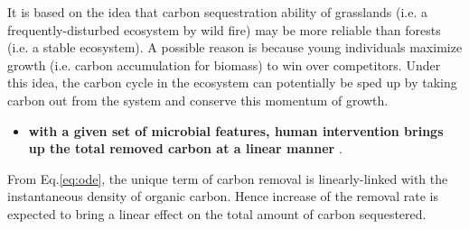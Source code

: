 \documentclass[../thesis.tex]{subfiles} %
\begin{document}
It is based on the idea that carbon sequestration ability of grasslands (i.e. a frequently-disturbed ecosystem by wild fire) may be more reliable than forests (i.e. a stable ecosystem).\autocite{dass2018grasslands}  A possible reason is because young individuals maximize growth (i.e. carbon accumulation for biomass) to win over competitors.  Under this idea, the carbon cycle in the ecosystem can potentially be sped up by taking carbon out from the system and conserve this momentum of growth.

\begin{itemize}
    \item \textbf{with a given set of microbial features, human intervention brings up the total removed carbon at a linear manner}
    .
\end{itemize}

From Eq.\ref{eq:ode}, the unique term of carbon removal is linearly-linked with the instantaneous density of organic carbon.  Hence increase of the removal rate is expected to bring a linear effect on the total amount of carbon sequestered.
\end{document}
